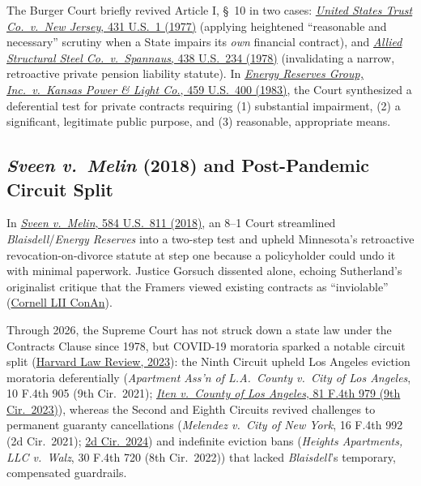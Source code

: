 \documentclass[12pt]{article}
\begin{document}
The Burger Court briefly revived Article I, \S\ 10 in two cases: \href{https://supreme.justia.com/cases/federal/us/431/1/}{\emph{United States Trust Co.\ v.\ New Jersey}, 431 U.S.\ 1 (1977)} (applying heightened ``reasonable and necessary'' scrutiny when a State impairs its \emph{own} financial contract), and \href{https://supreme.justia.com/cases/federal/us/438/234/}{\emph{Allied Structural Steel Co.\ v.\ Spannaus}, 438 U.S.\ 234 (1978)} (invalidating a narrow, retroactive private pension liability statute). In \href{https://supreme.justia.com/cases/federal/us/459/400/}{\emph{Energy Reserves Group, Inc.\ v.\ Kansas Power \& Light Co.}, 459 U.S.\ 400 (1983)}, the Court synthesized a deferential test for private contracts requiring (1) substantial impairment, (2) a significant, legitimate public purpose, and (3) reasonable, appropriate means.

\subsection{\emph{Sveen v.\ Melin} (2018) and Post-Pandemic Circuit Split}
In \href{https://www.law.cornell.edu/supremecourt/text/16-1432}{\emph{Sveen v.\ Melin}, 584 U.S.\ 811 (2018)}, an 8--1 Court streamlined \emph{Blaisdell}/\emph{Energy Reserves} into a two-step test and upheld Minnesota's retroactive revocation-on-divorce statute at step one because a policyholder could undo it with minimal paperwork. Justice Gorsuch dissented alone, echoing Sutherland's originalist critique that the Framers viewed existing contracts as ``inviolable'' (\href{https://www.law.cornell.edu/constitution-conan/article-1/section-10/clause-1/historical-background-on-the-contract-clause}{Cornell LII ConAn}).

Through 2026, the Supreme Court has not struck down a state law under the Contracts Clause since 1978, but COVID-19 moratoria sparked a notable circuit split (\href{https://harvardlawreview.org/print/vol-136/the-contract-clause-reawakened-in-the-age-of-covid-19/}{Harvard Law Review, 2023}): the Ninth Circuit upheld Los Angeles eviction moratoria deferentially (\emph{Apartment Ass'n of L.A.\ County v.\ City of Los Angeles}, 10 F.4th 905 (9th Cir.\ 2021); \href{https://www.govinfo.gov/content/pkg/USCOURTS-ca9-22-55480/pdf/USCOURTS-ca9-22-55480-0.pdf}{\emph{Iten v.\ County of Los Angeles}, 81 F.4th 979 (9th Cir.\ 2023)}), whereas the Second and Eighth Circuits revived challenges to permanent guaranty cancellations (\emph{Melendez v.\ City of New York}, 16 F.4th 992 (2d Cir.\ 2021); \href{https://www.govinfo.gov/content/pkg/USCOURTS-ca2-23-00683/pdf/USCOURTS-ca2-23-00683-0.pdf}{2d Cir.\ 2024}) and indefinite eviction bans (\emph{Heights Apartments, LLC v.\ Walz}, 30 F.4th 720 (8th Cir.\ 2022)) that lacked \emph{Blaisdell}'s temporary, compensated guardrails.
\end{document}
